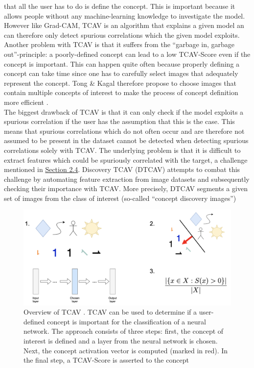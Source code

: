 \documentclass{article}
\begin{document}
that all the user has to do is define the concept. This is important because it allows people without any machine-learning
knowledge to investigate the model. \\
However like Grad-CAM, TCAV is an algorithm that explains a given model an can
therefore only detect spurious correlations which the given model exploits. Another problem with TCAV
is that it suffers from the \enquote{garbage in, garbage out}-principle: a poorly-defined concept can lead to a low
TCAV-Score even if the concept is important. This can happen quite often because properly defining a concept can take time
since one has to carefully select images that adequately represent the concept. Tong \& Kagal therefore propose to choose
images that contain multiple concepts of interest to make the process of concept definition
more efficient \cite{tong2020investigating}. \\ 
The biggest drawback of TCAV is that it can only check if the model exploits a spurious correlation if the user has the assumption 
that this is the case. This means that spurious correlations which do not often occur and are therefore not assumed 
to be present in the dataset cannot be detected when detecting spurious correlations solely with TCAV. The underlying problem is
that it is difficult to extract features which could be spuriously correlated with the target, a challenge mentioned in
\hyperref[sec:challenged]{Section 2.4}. Discovery TCAV (DTCAV) \cite{ghorbani2019automating} attempts to combat this challenge by automating feature extraction from image datasets and subsequently checking their importance with TCAV. More precisely, DTCAV segments a given set of images from the class of interest (so-called \enquote{concept discovery images}) 

\begin{figure}
    \centering
    \includegraphics[scale=0.45]{tcav.png}
    \caption{Overview of TCAV \cite{pmlr-v80-kim18d}. TCAV can be used to determine if a user-defined
    concept is important for the classification of a neural network. The approach consists of three steps: first,
    the concept of interest is defined and a layer from the neural network is chosen. Next, the concept activation
    vector is computed (marked in red). In the final step, a TCAV-Score is asserted to the concept}
    \label{fig:tcav}
\end{figure}
\end{document}
